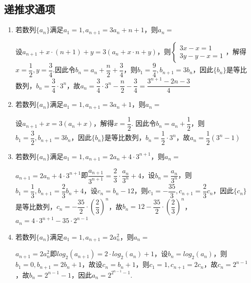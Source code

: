 \subsection*{递推求通项}
\begin{enumerate}
    \item 若数列$\{a_n\}$满足$a_1 = 1, a_{n+1} = 3a_n + n + 1$，则$a_n = $
    \begin{jieda}
        设$a_{n+1} + x \cdot (n+1) + y = 3(a_n + x \cdot n + y)$，则$\left \{\begin{array}{l}
            3x - x = 1  \\
            3y - y - x = 1
        \end{array} \right.$，解得$x = \dfrac{1}{2}, y = \dfrac{3}{4}$.因此令$b_n = a_n + \dfrac{n}{2} + \dfrac{3}{4}$，则$b_1 = \dfrac{9}{4}, b_{n+1} = 3b_n$，因此$\{b_n\}$是等比数列，$b_n = \dfrac{3}{4} \cdot 3^n$，故$a_n = \dfrac{3}{4} \cdot 3^n - \dfrac{n}{2} - \dfrac{3}{4} = \dfrac{3^{n+1}-2n-3}{4}$
    \end{jieda}
    \item 若数列$\{a_n\}$满足$a_1 = 1, a_{n+1} = 3a_n+1$，则$a_n = $
    \begin{jieda}
        设$a_{n+1} + x = 3(a_n + x)$，解得$x = \dfrac{1}{2}$. 因此令$b_n = a_n + \dfrac{1}{2}$，则$b_1 = \dfrac{3}{2}, b_{n+1} = 3b_n$，因此$\{b_n\}$是等比数列，$b_n = \dfrac{1}{2} \cdot 3^n$，故$a_n = \dfrac{1}{2}(3^n - 1)$ 
    \end{jieda}
    \item 若数列$\{a_n\}$满足$a_1 = 1, a_{n+1} = 2a_n + 4 \cdot 3^{n+1}$，则$a_n = $
    \begin{jieda}
        $a_{n+1} = 2a_n + 4 \cdot 3^{n+1}$即$\dfrac{a_{n+1}}{3^{n+1}} = \dfrac{2}{3} \cdot \dfrac{a_n}{3^n} + 4$，设$b_n = \dfrac{a_n}{3^n}$，则$b_1 = \dfrac{1}{3}, b_{n+1} = \dfrac{2}{3}b_n + 4$，设$c_n = b_n - 12$，则$c_1 = -\dfrac{35}{3}, c_{n+1} = \dfrac{2}{3}c_n$，因此$\{c_n\}$是等比数列，$c_n = -\dfrac{35}{2} \cdot \left ( \dfrac{2}{3} \right )^n$，故$b_n = 12 - \dfrac{35}{2}  \cdot \left ( \dfrac{2}{3} \right )^n$，$a_n = 4 \cdot 3^{n+1} - 35 \cdot 2^{n-1}$
    \end{jieda}
    \item 若数列$\{a_n\}$满足$a_1 = 1, a_{n+1} = 2a_n^2$，则$a_n = $
    \begin{jieda}
        $a_{n+1} = 2a_n^2$即$log_2(a_{n+1}) = 2 \cdot log_2(a_n) + 1$，设$b_n = log_2(a_n)$，则$b_1 = 0, b_{n+1} = 2b_n + 1$，故设$c_n = b_n + 1$，则$c_1 = 1, c_{n+1} = 2c_n$，故$c_n = 2^{n-1}$，故$b_n = 2^{n-1}-1$，因此$a_n = 2^{2^{n-1}-1}$.

\end{jieda}
\end{enumerate}
